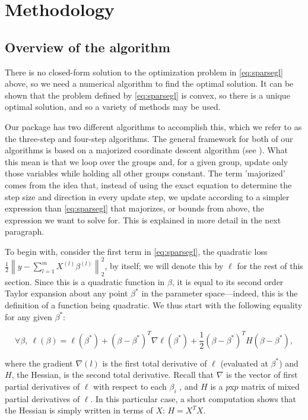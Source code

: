 \documentclass[titlepage]{article}
\newcommand{\norm}[1]{\left\lVert #1 \right\rVert}
\begin{document}
\section{Methodology}
\label{Sec:meth}

\subsection{Overview of the algorithm}

There is no closed-form solution to the optimization problem in \autoref{eq:sparsegl} above, so we need a numerical algorithm to find the optimal solution. It can be shown that the problem defined by \autoref{eq:sparsegl} is convex, so there is a unique optimal solution, and so a variety of methods may be used.

Our package has two different algorithms to accomplish this, which we refer to as the three-step and four-step algorithms. The general framework for both of our algorithms is based on a majorized coordinate descent algorithm (see \citep{yang2015fast, simon2013sparse}). What this mean is that we loop over the groups and, for a given group, update only those variables while holding all other groups constant. The term 'majorized' comes from the idea that, instead of using the exact equation to determine the step size and direction in every update step, we update according to a simpler expression than \autoref{eq:sparsegl} that majorizes, or bounds from above, the expression we want to solve for. This is explained in more detail in the next paragraph.

To begin with, consider the first term in \autoref{eq:sparsegl}, the quadratic loss $\frac{1}{2}\norm{y-\sum_{l=1}^mX^{(l)}\beta^{(l)}}_2^2$, by itself; we will denote this by $\ell$ for the rest of this section. Since this is a quadratic function in $\beta$, it is equal to its second order Taylor expansion about any point $\beta^*$ in the parameter space---indeed, this is the definition of a function being quadratic. We thus start with the following equality for any given $\beta^*$:  

\begin{equation}
\forall \beta,\ \ell(\beta) = \ell(\beta^*)+(\beta - \beta^*)^T\nabla \ell(\beta^*)+\frac{1}{2}(\beta - \beta^*)^T H (\beta - \beta^*),
\label{eq:TaylorExp}
\end{equation}

where the gradient $\nabla (l)$ is the first total derivative of $\ell$ (evaluated at $\beta^*$) and $H$, the Hessian, is the second total derivative. Recall that $\nabla$ is the vector of first partial derivatives of $\ell$ with respect to each $\beta_i$ , and $H$ is a $p$x$p$ matrix of mixed partial derivatives of $\ell$. In this particular case, a short computation shows that the Hessian is simply written in terms of $X$: $H = X^TX$.
\end{document}
